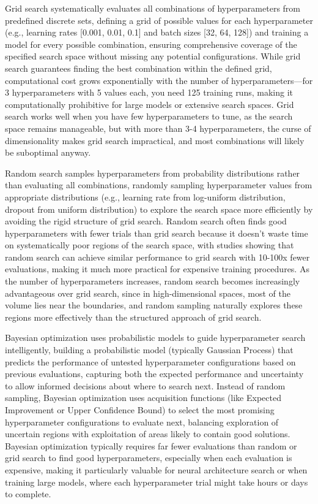 Grid search systematically evaluates all combinations of hyperparameters from predefined discrete sets, defining a grid of possible values for each hyperparameter (e.g., learning rates [0.001, 0.01, 0.1] and batch sizes [32, 64, 128]) and training a model for every possible combination, ensuring comprehensive coverage of the specified search space without missing any potential configurations. While grid search guarantees finding the best combination within the defined grid, computational cost grows exponentially with the number of hyperparameters—for 3 hyperparameters with 5 values each, you need 125 training runs, making it computationally prohibitive for large models or extensive search spaces. Grid search works well when you have few hyperparameters to tune, as the search space remains manageable, but with more than 3-4 hyperparameters, the curse of dimensionality makes grid search impractical, and most combinations will likely be suboptimal anyway.

Random search samples hyperparameters from probability distributions rather than evaluating all combinations, randomly sampling hyperparameter values from appropriate distributions (e.g., learning rate from log-uniform distribution, dropout from uniform distribution) to explore the search space more efficiently by avoiding the rigid structure of grid search. Random search often finds good hyperparameters with fewer trials than grid search because it doesn't waste time on systematically poor regions of the search space, with studies showing that random search can achieve similar performance to grid search with 10-100x fewer evaluations, making it much more practical for expensive training procedures. As the number of hyperparameters increases, random search becomes increasingly advantageous over grid search, since in high-dimensional spaces, most of the volume lies near the boundaries, and random sampling naturally explores these regions more effectively than the structured approach of grid search.

Bayesian optimization uses probabilistic models to guide hyperparameter search intelligently, building a probabilistic model (typically Gaussian Process) that predicts the performance of untested hyperparameter configurations based on previous evaluations, capturing both the expected performance and uncertainty to allow informed decisions about where to search next. Instead of random sampling, Bayesian optimization uses acquisition functions (like Expected Improvement or Upper Confidence Bound) to select the most promising hyperparameter configurations to evaluate next, balancing exploration of uncertain regions with exploitation of areas likely to contain good solutions. Bayesian optimization typically requires far fewer evaluations than random or grid search to find good hyperparameters, especially when each evaluation is expensive, making it particularly valuable for neural architecture search or when training large models, where each hyperparameter trial might take hours or days to complete.


